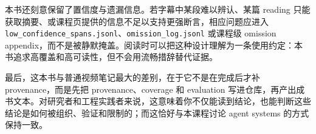 本书还刻意保留了置信度与遗漏信息。若字幕中某段难以辨认、某篇 reading 只能获取摘要、或课程页提供的信息不足以支持更强断言，相应问题应进入 \texttt{low\_confidence\_spans.jsonl}、\texttt{omission\_log.jsonl} 或课程级 omission appendix，而不是被静默掩盖。阅读时可以把这种设计理解为一条使用约定：本书追求高覆盖和高可读性，但不会用流畅措辞替代证据。

最后，这本书与普通视频笔记最大的差别，在于它不是在完成后才补 provenance，而是先把 provenance、coverage 和 evaluation 写进仓库，再产出成书文本。对研究者和工程实践者来说，这意味着你不仅能读到结论，也能判断这些结论是如何被组织、验证和限制的；而这恰好与本课程讨论 agent systems 的方式保持一致。
